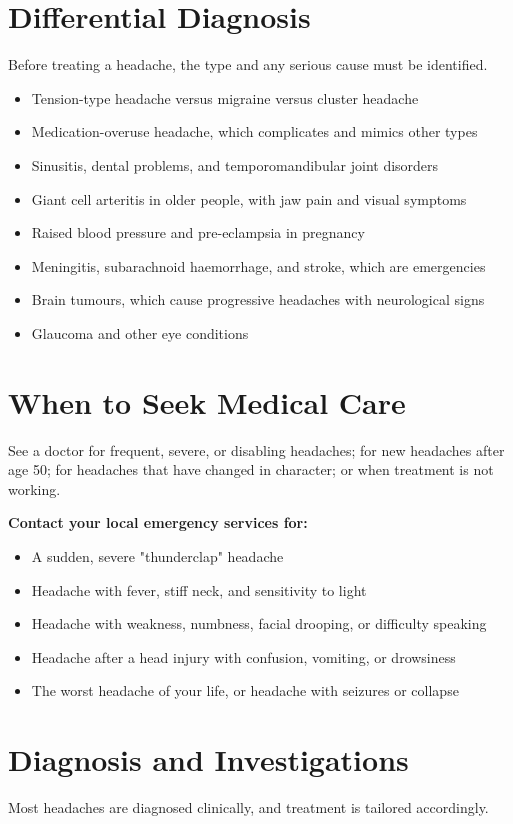 \section*{Differential Diagnosis}
Before treating a headache, the type and any serious cause must be identified.

\begin{itemize}
    \item Tension-type headache versus migraine versus cluster headache
    \item Medication-overuse headache, which complicates and mimics other types
    \item Sinusitis, dental problems, and temporomandibular joint disorders
    \item Giant cell arteritis in older people, with jaw pain and visual symptoms
    \item Raised blood pressure and pre-eclampsia in pregnancy
    \item Meningitis, subarachnoid haemorrhage, and stroke, which are emergencies
    \item Brain tumours, which cause progressive headaches with neurological signs
    \item Glaucoma and other eye conditions
\end{itemize}

\section*{When to Seek Medical Care}
See a doctor for frequent, severe, or disabling headaches; for new headaches after age 50; for headaches that have changed in character; or when treatment is not working.

\textbf{Contact your local emergency services for:}
\begin{itemize}
    \item A sudden, severe "thunderclap" headache
    \item Headache with fever, stiff neck, and sensitivity to light
    \item Headache with weakness, numbness, facial drooping, or difficulty speaking
    \item Headache after a head injury with confusion, vomiting, or drowsiness
    \item The worst headache of your life, or headache with seizures or collapse
\end{itemize}

\section*{Diagnosis and Investigations}
Most headaches are diagnosed clinically, and treatment is tailored accordingly.

